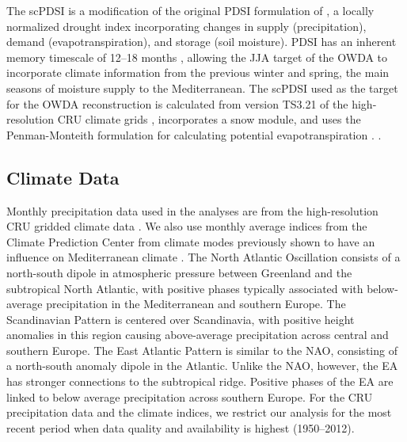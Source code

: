 \documentclass[draft,jgr]{AGUTeX}
\begin{document}
\begin{article}
\indent  The scPDSI is a modification of the original PDSI formulation of \cite{Palmer1965}, a locally normalized drought index incorporating changes in supply (precipitation), demand (evapotranspiration), and storage (soil moisture). PDSI has an inherent memory timescale of 12--18 months \citep{Guttman1998,Vicente2010}, allowing the JJA target of the OWDA to incorporate climate information from the previous winter and spring, the main seasons of moisture supply to the Mediterranean. The scPDSI used as the target for the OWDA reconstruction \citep{Schrier2013} is calculated from version TS3.21 of the high-resolution CRU climate grids \citep{Harris2014}, incorporates a snow module, and uses the Penman-Monteith formulation for calculating potential evapotranspiration \citep{Xu2002}. .

\subsection{Climate Data}
\noindent Monthly precipitation data used in the analyses are from the high-resolution CRU gridded climate data \citep[TS3.21,][]{Harris2014}. We also use monthly average indices from the Climate Prediction Center from climate modes previously shown to have an influence on Mediterranean climate \citep{Sousa2011}. The North Atlantic Oscillation \citep[NAO;][]{Hurrell1995} consists of a north-south dipole in atmospheric pressure between Greenland and the subtropical North Atlantic, with positive phases typically associated with below-average precipitation in the Mediterranean and southern Europe. The Scandinavian Pattern \citep[SCA;][]{Bueh2007} is centered over Scandinavia, with positive height anomalies in this region causing above-average precipitation across central and southern Europe. The East Atlantic Pattern \citep[EA;][]{Barnston1987} is similar to the NAO, consisting of a north-south anomaly dipole in the Atlantic. Unlike the NAO, however, the EA has stronger connections to the subtropical ridge. Positive phases of the EA are linked to below average precipitation across southern Europe. For the CRU precipitation data and the climate indices, we restrict our analysis for the most recent period when data quality and availability is highest (1950--2012).


\end{article}
\end{document}
